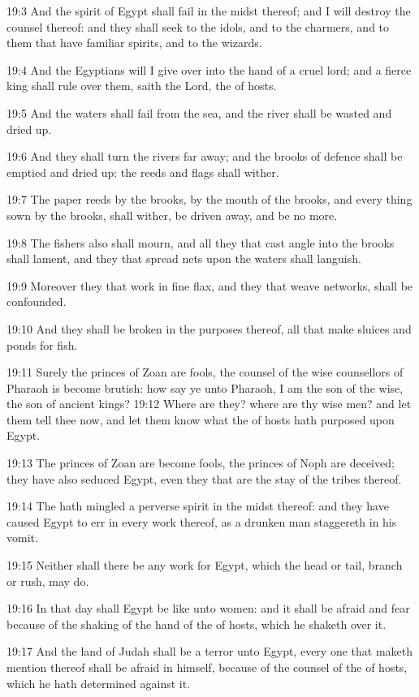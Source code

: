 19:3 And the spirit of Egypt shall fail in the midst thereof; and I
will destroy the counsel thereof: and they shall seek to the idols,
and to the charmers, and to them that have familiar spirits, and to
the wizards.

19:4 And the Egyptians will I give over into the hand of a cruel lord;
and a fierce king shall rule over them, saith the Lord, the \LORD of
hosts.

19:5 And the waters shall fail from the sea, and the river shall be
wasted and dried up.

19:6 And they shall turn the rivers far away; and the brooks of
defence shall be emptied and dried up: the reeds and flags shall
wither.

19:7 The paper reeds by the brooks, by the mouth of the brooks, and
every thing sown by the brooks, shall wither, be driven away, and be
no more.

19:8 The fishers also shall mourn, and all they that cast angle into
the brooks shall lament, and they that spread nets upon the waters
shall languish.

19:9 Moreover they that work in fine flax, and they that weave
networks, shall be confounded.

19:10 And they shall be broken in the purposes thereof, all that make
sluices and ponds for fish.

19:11 Surely the princes of Zoan are fools, the counsel of the wise
counsellors of Pharaoh is become brutish: how say ye unto Pharaoh, I
am the son of the wise, the son of ancient kings?  19:12 Where are
they? where are thy wise men? and let them tell thee now, and let them
know what the \LORD of hosts hath purposed upon Egypt.

19:13 The princes of Zoan are become fools, the princes of Noph are
deceived; they have also seduced Egypt, even they that are the stay of
the tribes thereof.

19:14 The \LORD hath mingled a perverse spirit in the midst thereof:
and they have caused Egypt to err in every work thereof, as a drunken
man staggereth in his vomit.

19:15 Neither shall there be any work for Egypt, which the head or
tail, branch or rush, may do.

19:16 In that day shall Egypt be like unto women: and it shall be
afraid and fear because of the shaking of the hand of the \LORD of
hosts, which he shaketh over it.

19:17 And the land of Judah shall be a terror unto Egypt, every one
that maketh mention thereof shall be afraid in himself, because of the
counsel of the \LORD of hosts, which he hath determined against it.

